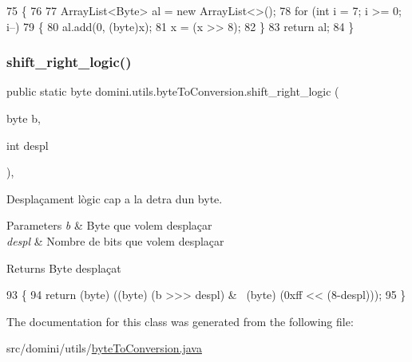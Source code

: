 \begin{DoxyCode}
75     \{
76 
77         ArrayList<Byte> al = \textcolor{keyword}{new} ArrayList<>();
78         \textcolor{keywordflow}{for} (\textcolor{keywordtype}{int} i = 7; i >= 0; i--)
79         \{
80             al.add(0, (byte)x);
81             x = (x >> 8);  
82         \}
83         \textcolor{keywordflow}{return} al;
84     \}
\end{DoxyCode}
\mbox{\label{classdomini_1_1utils_1_1byteToConversion_a0e232cb9d272ccc13accda58bab9f8e1}} 
\subsubsection{\texorpdfstring{shift\+\_\+right\+\_\+logic()}{shift\_right\_logic()}}
{\footnotesize\ttfamily public static byte domini.\+utils.\+byte\+To\+Conversion.\+shift\+\_\+right\+\_\+logic (\begin{DoxyParamCaption}\item[{byte}]{b,  }\item[{int}]{despl }\end{DoxyParamCaption})\hspace{0.3cm}{\ttfamily [inline]}, {\ttfamily [static]}}



Desplaçament lògic cap a la detra d\textquotesingle{}un byte. 


\begin{DoxyParams}{Parameters}
{\em b} & Byte que volem desplaçar \\
\hline
{\em despl} & Nombre de bits que volem desplaçar \\
\hline
\end{DoxyParams}
\begin{DoxyReturn}{Returns}
Byte desplaçat 
\end{DoxyReturn}

\begin{DoxyCode}
93                                                             \{
94         \textcolor{keywordflow}{return} (byte) ((byte) (b >>> despl) &~ (byte) (0xff << (8-despl)));
95     \}
\end{DoxyCode}


The documentation for this class was generated from the following file\+:\begin{DoxyCompactItemize}
\item 
src/domini/utils/\hyperlink{byteToConversion_8java}{byte\+To\+Conversion.\+java}\end{DoxyCompactItemize}
